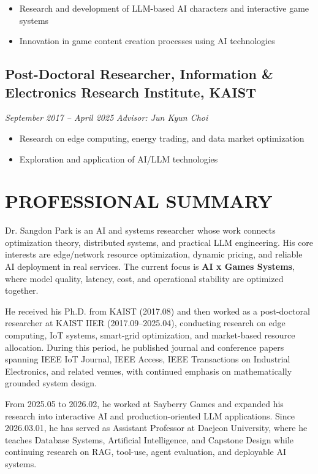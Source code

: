 \documentclass[11pt,a4paper]{article}
\begin{document}
\begin{itemize}
    \item Research and development of LLM-based AI characters and interactive game systems
    \item Innovation in game content creation processes using AI technologies
\end{itemize}

\subsection*{Post-Doctoral Researcher, Information \& Electronics Research Institute, KAIST}
\textit{September 2017 -- April 2025} \hfill \textit{Advisor: Jun Kyun Choi}

\begin{itemize}
    \item Research on edge computing, energy trading, and data market optimization
    \item Exploration and application of AI/LLM technologies
\end{itemize}

\section{PROFESSIONAL SUMMARY}
Dr. Sangdon Park is an AI and systems researcher whose work connects optimization theory, distributed systems, and practical LLM engineering.
His core interests are edge/network resource optimization, dynamic pricing, and reliable AI deployment in real services.
The current focus is \textbf{AI x Games Systems}, where model quality, latency, cost, and operational stability are optimized together.

He received his Ph.D. from KAIST (2017.08) and then worked as a post-doctoral researcher at KAIST IIER (2017.09--2025.04), conducting research on edge computing, IoT systems, smart-grid optimization, and market-based resource allocation.
During this period, he published journal and conference papers spanning IEEE IoT Journal, IEEE Access, IEEE Transactions on Industrial Electronics, and related venues, with continued emphasis on mathematically grounded system design.

From 2025.05 to 2026.02, he worked at Sayberry Games and expanded his research into interactive AI and production-oriented LLM applications.
Since 2026.03.01, he has served as Assistant Professor at Daejeon University, where he teaches Database Systems, Artificial Intelligence, and Capstone Design while continuing research on RAG, tool-use, agent evaluation, and deployable AI systems.
\end{document}
